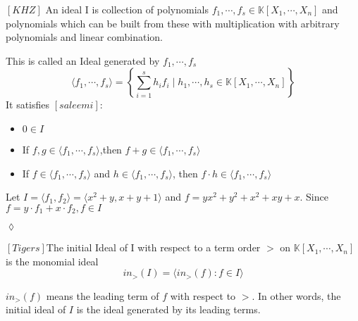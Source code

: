 \begin{env_definition}[Ideal]
$\left[KHZ \right] $
An ideal I is collection of polynomials $f_{1}, \cdots , f_{s} \in \mathbb{K}\left[X_{1}, \cdots, X_{n}\right] $ and polynomials which can be built from these with multiplication with arbitrary polynomials and linear combination.

\end{env_definition}
This is called an Ideal generated by $f_{1}, \cdots , f_{s}$ \\
\[ \langle f_{1}, \cdots , f_{s} \rangle = \left\lbrace  \sum_{i=1}^s h_{i}f_{i} \mid h_{1}, \cdots , h_{s} \in \mathbb{K}\left[X_{1}, \cdots, X_{n}\right] \right\rbrace \]
It satisfies $[saleemi] $:
\begin{center}

\begin{itemize}
\item
$0 \in I$ 
\item
If $f,g \in \langle f_{1}, \cdots , f_{s} \rangle$,then  $f+g \in \langle f_{1}, \cdots , f_{s} \rangle$ 
\item
If $f \in \langle f_{1}, \cdots , f_{s} \rangle$ and $h \in  \langle f_{1}, \cdots , f_{s} \rangle$, then $f \cdot h \in \langle f_{1}, \cdots , f_{s} \rangle$
\end{itemize}

\end{center}

\newpage

\begin{env_example}\normalfont
Let $ I= \langle f_{1},f_{2} \rangle = \langle x^{2}+y, x+y+1 \rangle $ and $f=yx^{2}+y^{2}+x^{2}+xy+x$. Since $f= y \cdot f_{1} + x \cdot f_{2}, f\in I$
\begin{flushright}
$\lozenge$
\end{flushright} 
\end{env_example}


\begin{env_definition}
$[Tigers]$The initial Ideal of I with respect to a term order $>$ on $\mathbb{K}\left[X_{1}, \cdots, X_{n}\right]$ is the monomial ideal \\
\[in_{>}(I) = \langle in_{>}(f) : f \in I  \rangle \] 

\end{env_definition}
$in_{>}(f)$ means the leading term of $f$ with respect to $>$. In other words, the initial ideal of $I$ is the ideal generated by its leading terms.



